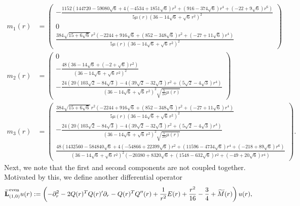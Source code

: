 \documentclass[11pt,reqno]{amsart}
\theoremstyle{remark}
\newcommand{\Lf}{\textup{\textbf{L}}}
\theoremstyle{definition}
\begin{document}
\begin{align*}
m_1(r)&=
\begin{pmatrix}
-\frac{1152\left(144720-59080\sqrt6+4(-4534+1851\sqrt6)r^2+(916-374\sqrt6)r^4+(-22+9\sqrt6)r^6\right)}
{5\mu(r)\left(36-14\sqrt6+\sqrt6\,r^2\right)^2}
\\
0
\\
\frac{384\sqrt{15+6\sqrt6}\,r^2\left(-2244+916\sqrt6+(852-348\sqrt6)r^2+(-27+11\sqrt6)r^4\right)}
{5\mu(r)\left(36-14\sqrt6+\sqrt6\,r^2\right)^2}
\end{pmatrix}
\\
m_2(r)&=
\begin{pmatrix}
0
\\
-\frac{48\left(36-14\sqrt6+(-2+\sqrt6)r^2\right)}
{\left(36-14\sqrt6+\sqrt6\,r^2\right)^2}
\\
-\frac{24\left(20(103\sqrt2-84\sqrt3)-4(39\sqrt2-32\sqrt3)r^2+(5\sqrt2-4\sqrt3)r^4\right)}
{\left(36-14\sqrt6+\sqrt6\,r^2\right)^2\sqrt{\frac{5}{24}\mu(r)}}
\end{pmatrix}
\\
m_3(r)&=
\begin{pmatrix}
\frac{384\sqrt{15+6\sqrt6}\,r^2\left(-2244+916\sqrt6+(852-348\sqrt6)r^2+(-27+11\sqrt6)r^4\right)}
{5\mu(r)\left(36-14\sqrt6+\sqrt6\,r^2\right)^2}
\\-\frac{24\left(20(103\sqrt2-84\sqrt3)-4(39\sqrt2-32\sqrt3)r^2+(5\sqrt2-4\sqrt3)r^4\right)}
{\left(36-14\sqrt6+\sqrt6\,r^2\right)^2\sqrt{\frac{5}{24}\mu(r)}}
\\
\frac{48\left(1432560-584840\sqrt6+4(-54866+22399\sqrt6)r^2+(11596-4734\sqrt6)r^4+(-218+89\sqrt6)r^6\right)}
{\left(36-14\sqrt6+\sqrt6\,r^2\right)^2\left(-20380+8320\sqrt6+(1548-632\sqrt6)r^2+(-49+20\sqrt6)r^4\right)}
\end{pmatrix}.
\end{align*}
Next, we note that the first and second components are not coupled together. Motivated by this, we define another differential operator
\begin{align*}
\widetilde{\Lf}_{(1,0)}^{\mathrm{even}} u(r)
&:= \left(-\partial_r^2-2Q(r)^TQ(r)'\partial_r-Q(r)^TQ''(r)
    +\frac{1}{r^2}E(r)
    +\frac{r^2}{16}-\frac34
    +\widetilde M(r)\right)u(r),
\end{align*}
\end{document}
